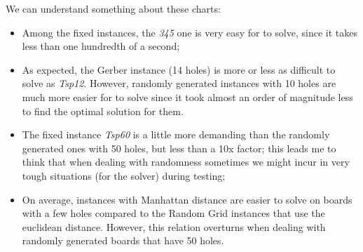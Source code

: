 We can understand something about these charts:

\begin{itemize}
  \item Among the fixed instances, the \textit{345} one is very easy for
    \cplex{} to solve, since it takes less than one hundredth of a second;
  \item As expected, the Gerber instance (14 holes) is more or less as
    difficult to solve as \textit{Tsp12}. However, randomly generated
    instances with 10 holes are much more easier for \cplex{} to solve since
    it took almost an order of magnitude less to find the optimal solution for
    them.
  \item The fixed instance \textit{Tsp60} is a little more demanding than the
    randomly generated ones with 50 holes, but less than a 10x factor; this
    leads me to think that when dealing with randomness sometimes we might
    incur in very tough situations (for the solver) during testing;
  \item On average, instances with Manhattan distance are easier to solve on
    boards with a few holes compared to the Random Grid instances that use the
    euclidean distance. However, this relation overturns when dealing with
    randomly generated boards that have 50 holes.
\end{itemize}
